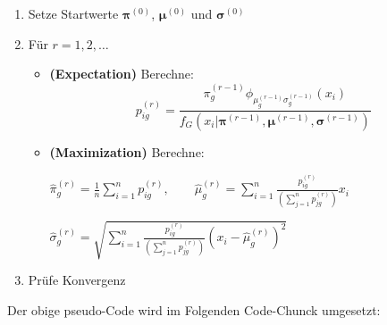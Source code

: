 \documentclass[
  ngerman,
]{book}
\begin{document}
\begin{enumerate}
\def\labelenumi{\arabic{enumi}.}
\item
  Setze Startwerte \(\boldsymbol{\pi}^{(0)}\), \(\boldsymbol{\mu}^{(0)}\) und \(\boldsymbol{\sigma}^{(0)}\)
\item
  Für \(r=1,2,\dots\)

  \begin{itemize}
  \item
    {\textbf{(Expectation)}} Berechne:
    \[p_{ig}^{(r)}=\frac{\pi_g^{(r-1)}\phi_{\mu^{(r-1)}_g\sigma_g^{(r-1)}}(x_i)}{f_G(x_i|\boldsymbol{\pi}^{(r-1)},\boldsymbol{\mu}^{(r-1)},\boldsymbol{\sigma}^{(r-1)})}\]
  \item
    {\textbf{(Maximization)}} Berechne:

    \(\hat\pi_g^{(r)}=\frac{1}{n}\sum_{i=1}^np_{ig}^{(r)},\quad\quad\hat\mu_g^{(r)}=\sum_{i=1}^n\frac{p_{ig}^{(r)}}{\left(\sum_{j=1}^np_{jg}^{(r)}\right)}x_i\)

    \(\hat\sigma_g^{(r)}=\sqrt{\sum_{i=1}^n\frac{p_{ig}^{(r)}}{\left(\sum_{j=1}^np_{jg}^{(r)}\right)}\left(x_i-\hat\mu_g^{(r)}\right)^2}\)
  \end{itemize}
\item
  Prüfe Konvergenz
\end{enumerate}

Der obige pseudo-Code wird im Folgenden Code-Chunck umgesetzt:
\end{document}
